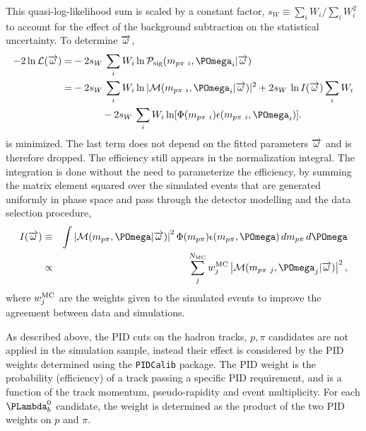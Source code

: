 This quasi-log-likelihood sum is scaled by a constant factor,  
$s_W \equiv \sum_i W_i/\sum_i W_i^2$ to account for the effect of the background subtraction on the statistical uncertainty. 
To determine $\overrightarrow{\omega}$, 
\begin{align}
-2\ln\Like(\Pars)=
& -2 s_W\,\sum_i W_i\ln \PDF_{\rm sig}(m_{p\pi~i},\POmega_i|\Pars)  \notag\\
= & -2 s_W\, \sum_i W_i \ln |\Mat(m_{p\pi~i},\POmega_i|\Pars)|^2
+ 2 s_W\, \ln I(\Pars) \sum_i W_i \notag\\
&~~~~~~~~~ -2 s_W\, \sum_i W_i \ln[ \Phi(m_{p\pi~i})\epsilon(m_{p\pi~i},\POmega_i) ].
\end{align}
is minimized.
The last term does not depend on the fitted parameters $\overrightarrow{\omega}$ and is therefore dropped.
The efficiency still appears in the normalization integral.  The integration is done without the need to parameterize the efficiency,
by summing the matrix element squared over the simulated events that are
generated uniformly in phase space and pass
through the detector modelling and the data selection procedure,
\begin{eqnarray}
I(\Pars)& \equiv & \int \left|\Mat(m_{p\pi},\POmega|\Pars)\right|^2
\Phi(m_{p\pi})
\epsilon(m_{p\pi},\POmega)
\,dm_{p\pi}\,d\POmega \notag\\
&\propto & \sum\limits_{j}^{N_{\rm MC}} w_j^{\rm MC} \left|\Mat(m_{p\pi~j},\POmega_{j}|\Pars)\right|^2,
\label{SUPPeq:signor}
\end{eqnarray}
where $w_j^{\rm MC}$ are the weights given to the simulated events
to  improve the agreement between data and simulations.

As described above, 
the PID cuts on the hadron tracks, 
$p,\pi$ candidates are not applied in the simulation sample,
instead their effect is considered by the PID weights determined using the \texttt{PIDCalib} package. 
The PID weight is the probability (efficiency) of a track passing a specific PID requirement, 
and is a function of the track momentum, 
pseudo-rapidity and event multiplicity. 
For each $\Lb$ candidate, 
the weight is determined as the product of the two PID weights on $p$ and $\pi$.



